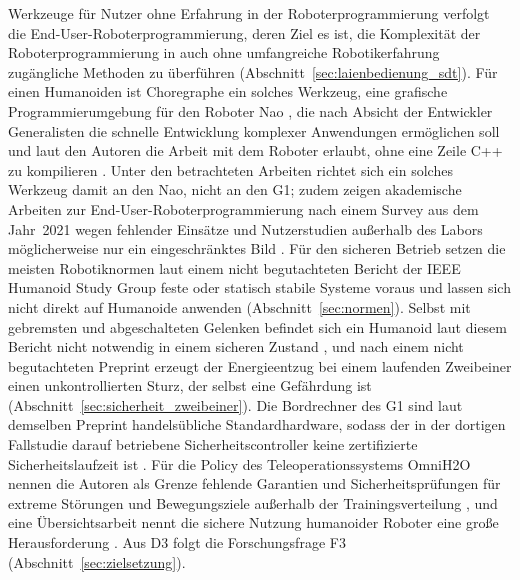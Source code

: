Werkzeuge für Nutzer ohne Erfahrung in der Roboterprogrammierung verfolgt die End-User-Roboterprogrammierung, deren Ziel es ist, die Komplexität der Roboterprogrammierung in auch ohne umfangreiche Robotikerfahrung zugängliche Methoden zu überführen \cite{Ajaykumar2021} (Abschnitt~\ref{sec:laienbedienung_sdt}).
Für einen Humanoiden ist Choregraphe ein solches Werkzeug, eine grafische Programmierumgebung für den Roboter Nao \cite{Pot2009}, die nach Absicht der Entwickler Generalisten die schnelle Entwicklung komplexer Anwendungen ermöglichen soll \cite{Pot2009} und laut den Autoren die Arbeit mit dem Roboter erlaubt, ohne eine Zeile C++ zu kompilieren \cite{Pot2009}.
Unter den betrachteten Arbeiten richtet sich ein solches Werkzeug damit an den Nao, nicht an den G1; zudem zeigen akademische Arbeiten zur End-User-Roboterprogrammierung nach einem Survey aus dem Jahr~2021 wegen fehlender Einsätze und Nutzerstudien außerhalb des Labors möglicherweise nur ein eingeschränktes Bild \cite{Ajaykumar2021}.
Für den sicheren Betrieb setzen die meisten Robotiknormen laut einem nicht begutachteten Bericht der IEEE Humanoid Study Group feste oder statisch stabile Systeme voraus \cite{Prather2025} und lassen sich nicht direkt auf Humanoide anwenden \cite{Prather2025} (Abschnitt~\ref{sec:normen}).
Selbst mit gebremsten und abgeschalteten Gelenken befindet sich ein Humanoid laut diesem Bericht nicht notwendig in einem sicheren Zustand \cite{Prather2025}, und nach einem nicht begutachteten Preprint erzeugt der Energieentzug bei einem laufenden Zweibeiner einen unkontrollierten Sturz, der selbst eine Gefährdung ist \cite{Ding2026} (Abschnitt~\ref{sec:sicherheit_zweibeiner}).
Die Bordrechner des G1 sind laut demselben Preprint handelsübliche Standardhardware, sodass der in der dortigen Fallstudie darauf betriebene Sicherheitscontroller keine zertifizierte Sicherheitslaufzeit ist \cite{Ding2026}.
Für die Policy des Teleoperationssystems OmniH2O nennen die Autoren als Grenze fehlende Garantien und Sicherheitsprüfungen für extreme Störungen und Bewegungsziele außerhalb der Trainingsverteilung \cite{He2024}, und eine Übersichtsarbeit nennt die sichere Nutzung humanoider Roboter eine große Herausforderung \cite{Tong2024}.
Aus D3 folgt die Forschungsfrage F3 (Abschnitt~\ref{sec:zielsetzung}).


